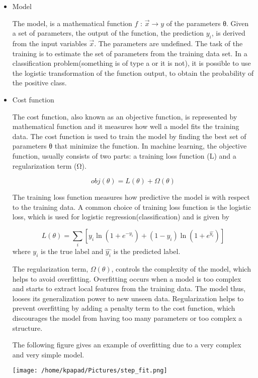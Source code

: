 \documentclass[11pt,a4paper]{article}
\begin{document}
\begin{itemize}
\item Model
\label{sec:orgaf95916}

The model, is a mathematical function \(f\text{ : } \vec{x} \rightarrow y\) of the parameters θ. Given a set of parameters, the output of the function, the prediction \(y_{i}\), is derived from the input variables \(\vec{x}\).
The parameters are undefined. The task of the training is to estimate the set of parameters from the training data set.
In a classification problem(something is of type a or it is not), it is possible to use the logistic transformation of the function output, to obtain the probability of the positive class.

\item Cost function
\label{sec:org741c834}

The cost function, also known as an objective function, is represented by mathematical function and it measures how well a model fits the training data. The cost function is used to train the model by finding the best set of parameters θ that minimize the function.
In machine learning, the objective function, usually consists of two parts: a training loss function (L) and a regularization term (Ω).

\[
obj(\theta) = L(\theta) + \Omega(\theta)
\]

The training loss function measures how predictive the model is with respect to the training data. A common choice of training loss function is the logistic loss, which is used for logistic regression(classification) and is given by

\[
L(\theta)=\sum _i [y_{i} \ln⁡( 1+e^{−\hat{y_{i}}})+(1-y_{i})\ln⁡(1+e^{\hat{y_{i}}})]
\]
where \(y_{i}\) is the true label and \(\hat{y_{i}}\) is the predicted label.

The regularization term, \(\Omega(\theta)\), controls the complexity of the model, which helps to avoid overfitting. Overfitting occurs when a model is too complex and starts to extract local features from the training data. The model thus, looses its generalization power to new unseen data. Regularization helps to prevent overfitting by adding a penalty term to the cost function, which discourages the model from having too many parameters or too complex a structure.

The following figure gives an example of overfitting due to a very complex and very simple model.
\begin{center}
\texttt{[image: /home/kpapad/Pictures/step\_fit.png]}
\end{center}
\end{itemize}
\end{document}

